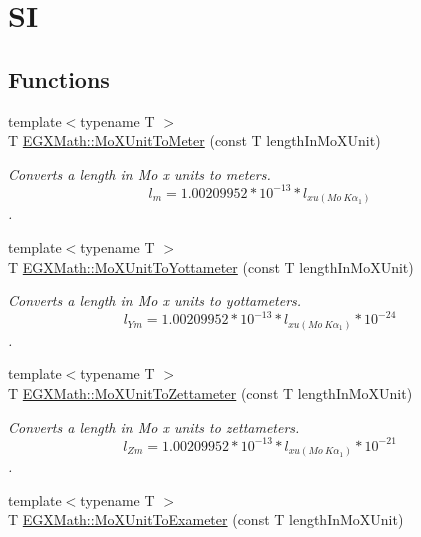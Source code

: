\hypertarget{group___e_g_x_math-_conversions-_length_conversions-_non-_s_i-_mo_x_unit-_s_i}{}\section{SI}
\label{group___e_g_x_math-_conversions-_length_conversions-_non-_s_i-_mo_x_unit-_s_i}
\subsection*{Functions}
\begin{DoxyCompactItemize}
\item 
{\footnotesize template$<$typename T $>$ }\\T \mbox{\hyperlink{group___e_g_x_math-_conversions-_length_conversions-_non-_s_i-_mo_x_unit-_s_i_gac13a59e6a52dfa24e2a39ff579ae60bb}{E\+G\+X\+Math\+::\+Mo\+X\+Unit\+To\+Meter}} (const T length\+In\+Mo\+X\+Unit)
\begin{DoxyCompactList}\small\item\em Converts a length in Mo x units to meters. \[ l_{m}=1.00209952*10^{-13} * l_{xu(Mo\ K\alpha_1)} \]. \end{DoxyCompactList}\item 
{\footnotesize template$<$typename T $>$ }\\T \mbox{\hyperlink{group___e_g_x_math-_conversions-_length_conversions-_non-_s_i-_mo_x_unit-_s_i_ga4924e06e3105b90d3d383bce75466c65}{E\+G\+X\+Math\+::\+Mo\+X\+Unit\+To\+Yottameter}} (const T length\+In\+Mo\+X\+Unit)
\begin{DoxyCompactList}\small\item\em Converts a length in Mo x units to yottameters. \[ l_{Ym}=1.00209952*10^{-13} * l_{xu(Mo\ K\alpha_1)} * 10^{-24} \]. \end{DoxyCompactList}\item 
{\footnotesize template$<$typename T $>$ }\\T \mbox{\hyperlink{group___e_g_x_math-_conversions-_length_conversions-_non-_s_i-_mo_x_unit-_s_i_ga42140ef81550c27028b758c9f15200e3}{E\+G\+X\+Math\+::\+Mo\+X\+Unit\+To\+Zettameter}} (const T length\+In\+Mo\+X\+Unit)
\begin{DoxyCompactList}\small\item\em Converts a length in Mo x units to zettameters. \[ l_{Zm}=1.00209952*10^{-13} * l_{xu(Mo\ K\alpha_1)} * 10^{-21} \]. \end{DoxyCompactList}\item 
{\footnotesize template$<$typename T $>$ }\\T \mbox{\hyperlink{group___e_g_x_math-_conversions-_length_conversions-_non-_s_i-_mo_x_unit-_s_i_ga063e533efef257dd481853b57712f0c6}{E\+G\+X\+Math\+::\+Mo\+X\+Unit\+To\+Exameter}} (const T length\+In\+Mo\+X\+Unit)

\end{DoxyCompactItemize}
